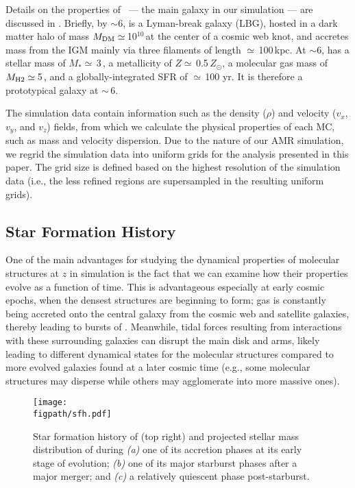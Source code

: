 \IfFileExists{emulateapjlegacy.cls}{\documentclass[iop]{emulateapjlegacy}}{\documentclass[iop]{emulateapj}}
\def\figpath{./Fig}
\begin{document}
Details on the properties of \flower\ --- the main galaxy in our simulation --- are discussed in \citet{Pallottini17b}.
Briefly, by \z$\sim$6, \flower is a Lyman-break galaxy (LBG), hosted in a dark matter halo of mass $M_{\rm DM}\simeq$\,10$^{10}$\,\Msun at the center of a cosmic web knot, and accretes mass from the IGM mainly via three filaments of length $\simeq$\,100\,kpc. At \z$\sim$6, \flower has a stellar mass of $M_*\simeq$\,3\,\Msun, a metallicity of $Z\simeq$\,0.5\,$Z_{\odot}$, a molecular gas mass of $M_{\rm H2}\simeq$\,5\,\Msun, and a globally-integrated SFR of $\simeq$\,100\,\Msun\,yr\pmOne. It is therefore a prototypical galaxy at \z$\sim$\,6.

The simulation data contain information such as the density ($\rho$) and velocity ($v_x$, $v_y$, and $v_z$) fields, from which we calculate
the physical properties of each MC, such as mass and velocity dispersion.
Due to the nature of our AMR simulation, we regrid the simulation data into uniform grids for the analysis presented in this paper.
The grid size is defined
based on the highest resolution of the simulation data (i.e., the less refined regions are supersampled in the resulting uniform grids).



\subsection{Star Formation History} \label{sec:sfh}
One of the main advantages for studying the dynamical properties of molecular structures at
$z$ in simulation is the fact that we can examine how their properties evolve
as a function of time.
This is advantageous especially at early cosmic epochs,
when the densest structures are beginning to form;
gas is constantly being accreted onto the central galaxy from the cosmic web and
satellite galaxies, thereby leading to bursts of \SF.
Meanwhile, tidal forces resulting from interactions with these surrounding
galaxies can disrupt the main disk and arms, likely leading to different dynamical states
for the molecular structures compared to more evolved galaxies found at
a later cosmic time (e.g., some molecular structures may disperse while others may agglomerate into more massive
ones). %

\begin{figure*}[!htbp]
\centering
\texttt{[image: \\figpath/sfh.pdf]}
\caption{
    Star formation history of \flower (top right) and
    projected stellar mass distribution of \flower during 
    {\it (a)} one of its accretion phases
    at its early stage of evolution; 
    {\it (b)} one of its major starburst phases
    after a major merger; and
    {\it (c)} a relatively quiescent phase post-starburst.
\label{fig:SFH}}
\end{figure*}
\end{document}
